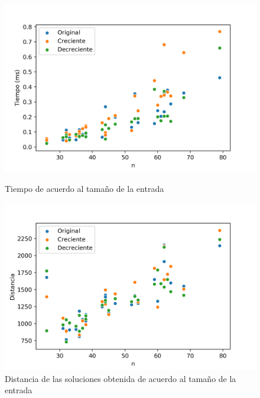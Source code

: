 \begin{figure}[H]
	\centering
	\begin{minipage}{0.44\textwidth}
		\centering
		\includegraphics[width=1\textwidth]{images/kmeans/expsortingtiempo}
		\caption{\footnotesize Tiempo de acuerdo al tamaño de la entrada}
		\label{fig:kmeans-sort-tiempo}
	\end{minipage}%
	\hspace{0.03\textwidth}
	\begin{minipage}{0.44\textwidth}
		\centering
		\includegraphics[width=1\textwidth]{images/kmeans/expsorting}
		\caption{\footnotesize Distancia de las soluciones obtenida de acuerdo al tamaño de la entrada}
		\label{fig:kmeans-sort-distancia}
	\end{minipage}%
\end{figure}

